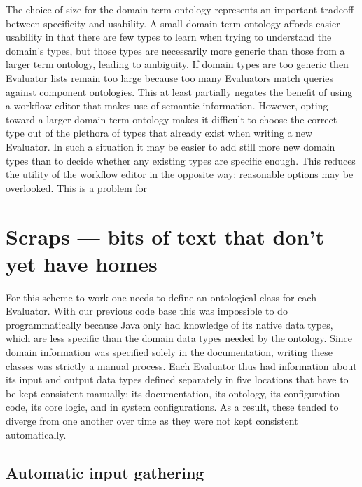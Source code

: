 \documentclass{article}
\begin{document}
The choice of size for the domain term ontology represents an important tradeoff between specificity and usability.
A small domain term ontology affords easier usability in that there are few types to learn when trying to understand the domain's types, but those types are necessarily more generic than those from a larger term ontology, leading to ambiguity.
If domain types are too generic then Evaluator lists remain too large because too many Evaluators match queries against component ontologies.
This at least partially negates the benefit of using a workflow editor that makes use of semantic information.
However, opting toward a larger domain term ontology makes it difficult to choose the correct type out of the plethora of types that already exist when writing a new Evaluator.
In such a situation it may be easier to add still more new domain types than to decide whether any existing types are specific enough.
This reduces the utility of the workflow editor in the opposite way:  reasonable options may be overlooked.
This is a problem for %

\section{Scraps --- bits of text that don't yet have homes} %

For this scheme to work one needs to define an ontological class for each Evaluator.  With our previous code base this was impossible to do programmatically because Java only had knowledge of its native data types, which are less specific than the domain data types needed by the ontology.  Since domain information was specified solely in the documentation, writing these classes was strictly a manual process.
Each Evaluator thus had information about its input and output data types defined separately in five locations that have to be kept consistent manually:  its documentation, its ontology, its configuration code, its core logic, and in system configurations.  As a result, these tended to diverge from one another over time as they were not kept consistent automatically.




\subsection{Automatic input gathering}
\end{document}
